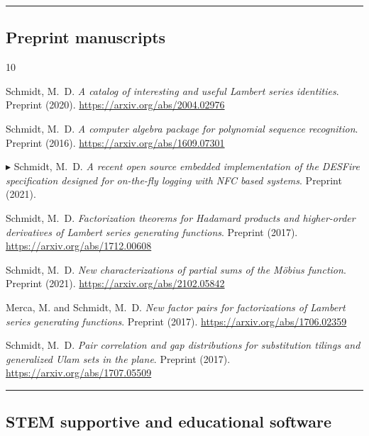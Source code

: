 \documentclass[10pt,reqno,letterpaper]{article}
\theoremstyle{plain}
\numberwithin{theorem}{section}
\theoremstyle{definition}
\newcounter{completeBibitemIncrementCtr}
\renewenvironment{thebibliography}[1]{
     \renewcommand{\refname}{} 
     
     \begin{oldthebibliography}{#1}
     \setlength{\itemsep}{0em}
     \setlength{\parskip}{0em}
     \setlength{\topsep}{0pt}
     \setlength{\partopsep}{0pt}
     \setcounter{enumiv}{\value{completeBibitemIncrementCtr}}
     \footnotesize 
}
{
     \setcounter{completeBibitemIncrementCtr}{\value{enumiv}}
     \end{oldthebibliography}
}
\begin{document}
\bigskip\hrule\bigskip
\subsection{Preprint manuscripts} 

\begin{thebibliography}{10}

Schmidt, M.~D. \emph{A catalog of interesting and useful Lambert series identities}. 
Preprint (2020). 
\url{https://arxiv.org/abs/2004.02976} 

Schmidt, M.~D. \emph{A computer algebra package for polynomial sequence recognition}. 
Preprint (2016). 
\url{https://arxiv.org/abs/1609.07301}

\item[$\blacktriangleright$]
Schmidt, M.~D. \emph{A recent open source embedded implementation of the DESFire specification 
                     designed for on-the-fly logging with NFC based systems}. Preprint (2021).

Schmidt, M.~D. \emph{Factorization theorems for Hadamard products and 
                     higher-order derivatives of Lambert series generating functions}. 
Preprint (2017). 
\url{https://arxiv.org/abs/1712.00608} 

Schmidt, M.~D. \emph{New characterizations of partial sums of the M\"{o}bius function}. 
Preprint (2021). 
\url{https://arxiv.org/abs/2102.05842}

Merca, M. and Schmidt, M.~D. \emph{New factor pairs for factorizations of Lambert series generating functions}. 
Preprint (2017). 
\url{https://arxiv.org/abs/1706.02359}

Schmidt, M.~D. \emph{Pair correlation and gap distributions for substitution tilings and 
                     generalized Ulam sets in the plane}. 
Preprint (2017). 
\url{https://arxiv.org/abs/1707.05509}

\end{thebibliography}

\bigskip\hrule\bigskip
\subsection{STEM supportive and educational software}
\end{document}
